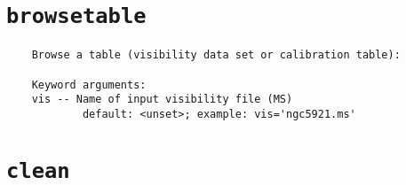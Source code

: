 \section{{\tt browsetable}}
\label{section:tasks.browsetable}

\small
\begin{verbatim}
    Browse a table (visibility data set or calibration table):
    
    Keyword arguments:
    vis -- Name of input visibility file (MS)
            default: <unset>; example: vis='ngc5921.ms'

\end{verbatim}
\normalsize


\section{{\tt clean}}
\label{section:tasks.clean}

